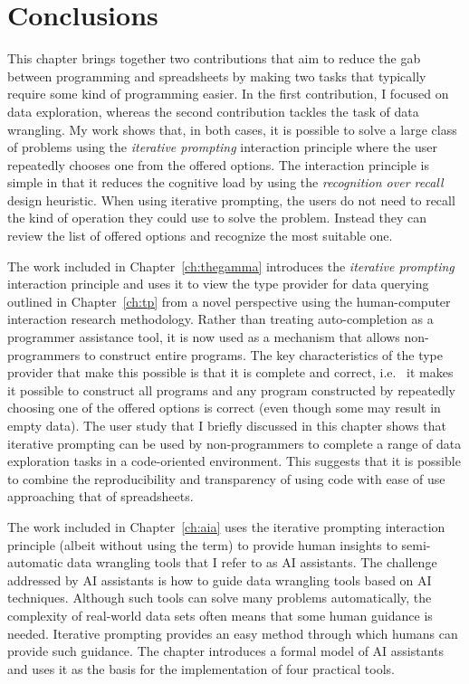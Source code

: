 \documentclass[fleqn,11pt]{report}
\theoremstyle{definition}
\begin{document}
\section{Conclusions}

This chapter brings together two contributions that aim to reduce the gab between programming
and spreadsheets by making two tasks that typically require some kind of programming easier.
In the first contribution, I focused on data exploration, whereas the second contribution tackles
the task of data wrangling. My work shows that, in both cases, it is possible to solve
a large class of problems using the \emph{iterative prompting} interaction principle where the
user repeatedly chooses one from the offered options. The interaction principle is simple in
that it reduces the cognitive load by using the \emph{recognition over recall} design heuristic.
When using iterative prompting, the users do not need to recall the kind of operation they
could use to solve the problem. Instead they can review the list of offered options and recognize
the most suitable one.

The work included in Chapter~\ref{ch:thegamma} introduces the \emph{iterative prompting}
interaction principle and uses it to view the type provider for data querying outlined in
Chapter~\ref{ch:tp} from a novel perspective using the human-computer interaction research
methodology. Rather than treating auto-completion as a programmer assistance tool, it is
now used as a mechanism that allows non-programmers to construct entire programs. The key
characteristics of the type provider that make this possible is that it is complete and correct,
i.e.~ it makes it possible to construct all programs and any program constructed by
repeatedly choosing one of the offered options is correct (even though some may result in
empty data). The user study that I briefly discussed in this chapter shows that iterative
prompting can be used by non-programmers to complete a range of data exploration tasks
in a code-oriented environment. This suggests that it is possible to combine the reproducibility
and transparency of using code with ease of use approaching that of spreadsheets.

The work included in Chapter~\ref{ch:aia} uses the iterative prompting interaction principle
(albeit without using the term) to provide human insights to semi-automatic data wrangling
tools that I refer to as AI assistants. The challenge addressed by AI assistants is how to
guide data wrangling tools based on AI techniques. Although such tools can solve many problems
automatically, the complexity of real-world data sets often means that some human guidance
is needed. Iterative prompting provides an easy method through which humans can provide such
guidance. The chapter introduces a formal model of AI assistants and uses it as the basis for
the implementation of four practical tools.
\end{document}
